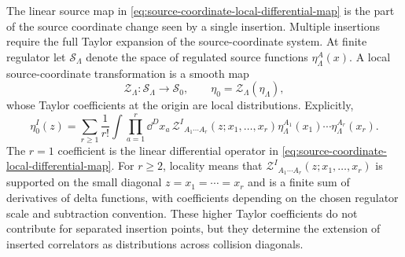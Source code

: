 The linear source map in
\eqref{eq:source-coordinate-local-differential-map} is the part of the source
coordinate change seen by a single insertion.  Multiple insertions require
the full Taylor expansion of the source-coordinate system.  At finite regulator let
\(\mathcal S_\Lambda\) denote the space of regulated source functions
\(\eta_\Lambda^A(x)\).  A local source-coordinate transformation is a smooth map
\[
  \mathcal Z_\Lambda:\mathcal S_\Lambda\longrightarrow \mathcal S_0,
  \qquad
  \eta_0=\mathcal Z_\Lambda(\eta_\Lambda),
\]
whose Taylor coefficients at the origin are local distributions.  Explicitly,
\begin{equation}
  \eta_0^I(z)
  =
  \sum_{r\ge1}\frac1{r!}
  \int\prod_{a=1}^r\dd^D x_a\,
  \mathcal Z^I{}_{A_1\cdots A_r}
    (z;x_1,\ldots,x_r)
  \eta_\Lambda^{A_1}(x_1)\cdots\eta_\Lambda^{A_r}(x_r).
  \label{eq:local-source-coordinate-taylor-map}
\end{equation}
The \(r=1\) coefficient is the linear differential operator in
\eqref{eq:source-coordinate-local-differential-map}.  For \(r\ge2\), locality
means that
\(\mathcal Z^I{}_{A_1\cdots A_r}(z;x_1,\ldots,x_r)\) is supported on the
small diagonal \(z=x_1=\cdots=x_r\) and is a finite sum of derivatives of
delta functions, with coefficients depending on the chosen regulator scale
and subtraction convention.  These higher Taylor coefficients do not
contribute for separated insertion points, but they determine the extension
of inserted correlators as distributions across collision diagonals.

